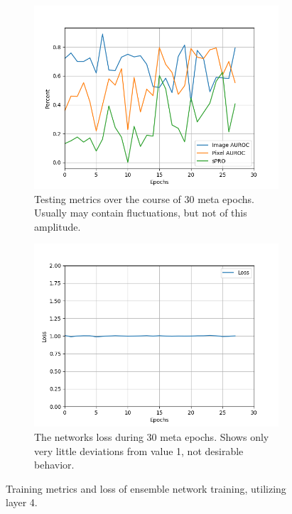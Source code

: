 \begin{figure}[htbp]
    \centering
    \begin{subfigure}[b]{0.4\textwidth}
        \includegraphics[width=\textwidth]{figures/faillayer34/auprosetc.png}
        \caption{Testing metrics over the course of 30 meta epochs. Usually may contain fluctuations, but not of this amplitude.}
        \label{fig:failmetrics}
    \end{subfigure}
    \begin{subfigure}[b]{0.4\textwidth}
        \includegraphics[width=\textwidth]{figures/faillayer34/loss_fail.png}
        \caption{The networks loss during 30 meta epochs. Shows only very little deviations from value 1, not desirable behavior.}
        \label{fig:failloss}
    \end{subfigure}
    \caption{Training metrics and loss of ensemble network training, utilizing layer 4.}
    \label{fig:failmetricsloss}
\end{figure}
